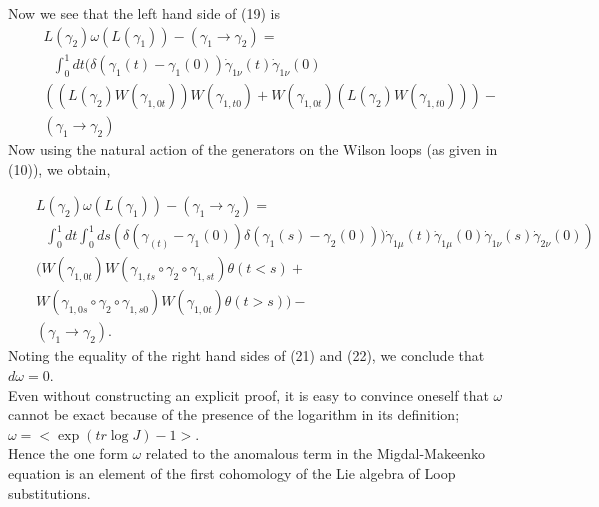 \documentclass[a4paper,12]{article}
\begin{document}
Now we see that the left hand side of (19) is 
\begin{eqnarray}
&&L(\gamma _2)\omega (L(\gamma _1)) - (\gamma_1 \rightarrow \gamma _2 ) =\nonumber\\ 
&&\mbox{ }\int _0 ^1 dt (\delta (\gamma _1(t) - \gamma _1(0))\dot{\gamma }_{1\nu 
}(t)\dot{\gamma }_{1\nu }(0) \nonumber\\
& &(\left( L(\gamma _2)W (\gamma 
_{1,0t})\right)W(\gamma _{1,t0}) + W(\gamma 
_{1,0t})\left( L(\gamma _2)W(\gamma _{1,t0})\right)) - \nonumber\\
& &(\gamma _1 \rightarrow \gamma _2)
\end{eqnarray}
Now using the natural action of the generators on the Wilson loops (as 
given in (10)), we obtain,

\begin{eqnarray}
&&L(\gamma _2)\omega (L(\gamma _1)) - (\gamma_1 \rightarrow \gamma _2 ) =\nonumber\\
&&\mbox{ }\int _0^1dt\int
_0^1ds \left(\delta(\gamma _(t) - \gamma _1(0))\delta (\gamma _1(s) -
\gamma _2(0)) )\dot{\gamma }_{1\mu }(t)\dot{\gamma }_{1\mu }(0)
\dot{\gamma }_{1\nu }(s)\dot{\gamma }_{2\nu
}(0) \right) \nonumber\\
& &(W(\gamma _{1,0t})W(\gamma _{1,ts}\circ \gamma _2 \circ \gamma
_{1,st})\theta (t<s) +\nonumber\\
& & W(\gamma _{1,0s}\circ \gamma _2 \circ \gamma _{1,s0})W(\gamma
_{1,0t})\theta
(t>s) ) - \nonumber \\
& &(\gamma _1 \rightarrow \gamma _2).
\end{eqnarray}
Noting the equality of the right hand sides of (21) and (22), we conclude 
that $d\omega = 0$. \\ Even without constructing an explicit proof, it is easy to convince oneself that 
$\omega $ cannot be exact because of the presence of the logarithm in its 
definition; $\omega = <\exp (tr 
\log J) -1>$.\\Hence the one form $\omega $ related to the anomalous 
term in the Migdal-Makeenko equation is an element of the first cohomology 
of the Lie algebra of Loop substitutions. \\
\end{document}
